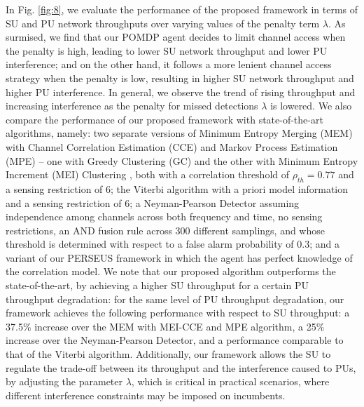 \documentclass[10pt,twocolumn]{IEEEtran}
\begin{document}
In Fig. \ref{fig:8}, we evaluate the performance of the proposed framework in terms of SU and PU network throughputs over varying values of the penalty term $\lambda$. As surmised, we find that our POMDP agent decides to limit channel access when the penalty is high, leading to lower SU network throughput and lower PU interference; and on the other hand, it follows a more lenient channel access strategy when the penalty is low, resulting in higher SU network throughput and higher PU interference. In general, we observe the trend of rising throughput and increasing interference as the penalty for missed detections $\lambda$ is lowered.
We also compare the performance of our proposed framework with state-of-the-art algorithms, namely: two separate versions of Minimum Entropy Merging (MEM) with Channel Correlation Estimation (CCE) and Markov Process Estimation (MPE) -- one with Greedy Clustering (GC) and the other with Minimum Entropy Increment (MEI) Clustering \cite{6956794}, both with a correlation threshold of $\rho_{th}{=}0.77$ and a sensing restriction of $6$; the Viterbi algorithm \cite{4554696} with a priori model information and a sensing restriction of $6$; a Neyman-Pearson Detector \cite{5167826} assuming independence among channels across both frequency and time, no sensing restrictions, an AND fusion rule across 300 different samplings, and whose threshold is determined with respect to a false alarm probability of $0.3$; and a variant of our PERSEUS framework in which the agent has perfect knowledge of the correlation model. We note that our proposed algorithm outperforms the state-of-the-art,
by achieving a higher SU throughput for a certain PU throughput degradation: for the same level of PU throughput degradation, our framework achieves the following performance with respect to SU throughput: a 37.5\% increase over the MEM with MEI-CCE and MPE algorithm, a 25\% increase over the Neyman-Pearson Detector, and a performance comparable to that of the Viterbi algorithm. Additionally, our framework allows the SU to regulate the trade-off between its throughput and the interference caused to PUs, by adjusting the parameter $\lambda$, which is critical in practical scenarios, where different interference constraints may be imposed on incumbents.
\vspace{-5mm}
\end{document}
